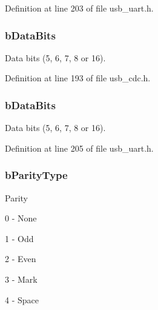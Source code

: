 Definition at line 203 of file usb\-\_\-uart.\-h.

\hypertarget{struct_u_s_b___c_d_c___line___coding_aad12e236e2d98e282eecda84c236d5bc}{
\subsubsection[{b\-Data\-Bits}]{ b\-Data\-Bits}}\label{struct_u_s_b___c_d_c___line___coding_aad12e236e2d98e282eecda84c236d5bc}
Data bits (5, 6, 7, 8 or 16). 

Definition at line 193 of file usb\-\_\-cdc.\-h.

\hypertarget{struct_u_s_b___c_d_c___line___coding_ad836f51a0b3eb4521d4448a22efe1dd3}{
\subsubsection[{b\-Data\-Bits}]{ b\-Data\-Bits}}\label{struct_u_s_b___c_d_c___line___coding_ad836f51a0b3eb4521d4448a22efe1dd3}
Data bits (5, 6, 7, 8 or 16). 

Definition at line 205 of file usb\-\_\-uart.\-h.

\hypertarget{struct_u_s_b___c_d_c___line___coding_aa4bacb5291241e2a338b40c77d73ebd5}{
\subsubsection[{b\-Parity\-Type}]{ b\-Parity\-Type}}\label{struct_u_s_b___c_d_c___line___coding_aa4bacb5291241e2a338b40c77d73ebd5}
Parity
\begin{DoxyItemize}
\item 0 -\/ None
\item 1 -\/ Odd
\item 2 -\/ Even
\item 3 -\/ Mark
\item 4 -\/ Space
\end{DoxyItemize}

